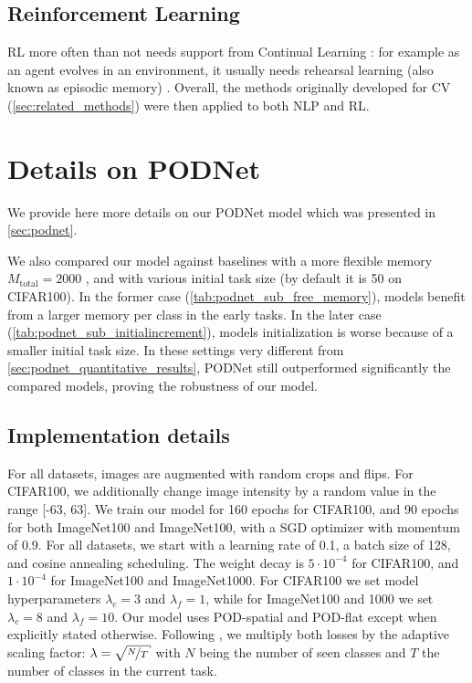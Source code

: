 \subsection{Reinforcement Learning}
\label{sec:related_rl}


\ac{RL} \citep{sutton1998rl} more often than not needs support from Continual Learning
\citep{khetarpal2020continualrl}: for example as an agent evolves in an environment, it usually
needs rehearsal learning (also known as episodic memory) \citep{mnih2013atarirl}. Overall, the
methods originally developed for \ac{CV} (\autoref{sec:related_methods}) were then applied to both
\ac{NLP} and \ac{RL}.


\section{Details on PODNet}
\label{sec:appendix_podnet}

We provide here more details on our PODNet model which was presented in \autoref{sec:podnet}.

We also compared our model against baselines with a more flexible memory $M_{\text{total}} = 2000$
\citep{rebuffi2017icarl,wu2019bias_correction}, and with various initial task size (by default it is
50 on CIFAR100). In the former case (\autoref{tab:podnet_sub_free_memory}), models benefit from a
larger memory per class in the early tasks. In the later case
(\autoref{tab:podnet_sub_initialincrement}), models initialization is worse because of a smaller
initial task size. In these settings very different from \autoref{sec:podnet_quantitative_results},
\ac{PODNet} still outperformed significantly the compared models, proving the robustness of our
model.




\subsection{Implementation details}

For all datasets, images are augmented with random crops and flips. For CIFAR100, we additionally
change image intensity by a random value in the range [-63, 63].
%
We train our model for 160 epochs for CIFAR100, and 90 epochs for both ImageNet100 and ImageNet100,
with a SGD optimizer with momentum of 0.9. For all datasets, we start with a learning rate of 0.1, a
batch size of 128, and cosine annealing scheduling.
%
The weight decay is $5\cdot 10^{-4}$ for CIFAR100, and $1\cdot 10^{-4}$ for ImageNet100 and
ImageNet1000. For CIFAR100 we set model hyperparameters $\lambda_c = 3$ and $\lambda_f=1$, while for
ImageNet100 and 1000 we set $\lambda_c = 8$ and $\lambda_f =10$. Our model uses POD-spatial and
POD-flat except when explicitly stated otherwise. Following \citet{hou2019ucir}, we multiply both
losses by the adaptive scaling factor: $\lambda=\sqrt{\nicefrac{N}{T}}$ with $N$ being the number of
seen classes and $T$ the number of classes in the current task.

